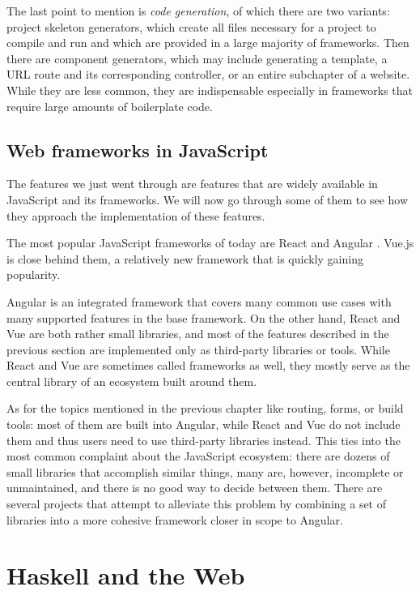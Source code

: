 \documentclass[english,zadani,odsaz]{fitthesis}
\begin{document}
The last point to mention is \emph{code generation}, of which there are two variants:
project skeleton generators, which create all files necessary for a project to
compile and run and which are provided in a large majority of frameworks. Then
there are component generators, which may include generating a template, a URL
route and its corresponding controller, or an entire subchapter of a
website. While they are less common, they are indispensable especially in
frameworks that require large amounts of boilerplate code.

\section{Web frameworks in JavaScript}
\label{sec:org5cb1037}
The features we just went through are features that are widely available in
JavaScript and its frameworks. We will now go through some of them to see how
they approach the implementation of these features.

The most popular JavaScript frameworks of today are React and Angular
\cite{frontend-cmp}. Vue.js is close behind them, a relatively new framework that
is quickly gaining popularity.

Angular is an integrated framework that covers many common use cases with many
supported features in the base framework. On the other hand, React and Vue are
both rather small libraries, and most of the features described in the previous
section are implemented only as third-party libraries or tools. While React and
Vue are sometimes called frameworks as well, they mostly serve as the central
library of an ecosystem built around them.

As for the topics mentioned in the previous chapter like routing, forms, or
build tools: most of them are built into Angular, while React and Vue do not
include them and thus users need to use third-party libraries instead. This ties
into the most common complaint about the JavaScript ecosystem: there are dozens
of small libraries that accomplish similar things, many are, however, incomplete
or unmaintained, and there is no good way to decide between them. There are
several projects that attempt to alleviate this problem by combining a set of
libraries into a more cohesive framework closer in scope to Angular.

\chapter{Haskell and the Web}
\label{sec:org60b4e51}
\end{document}
